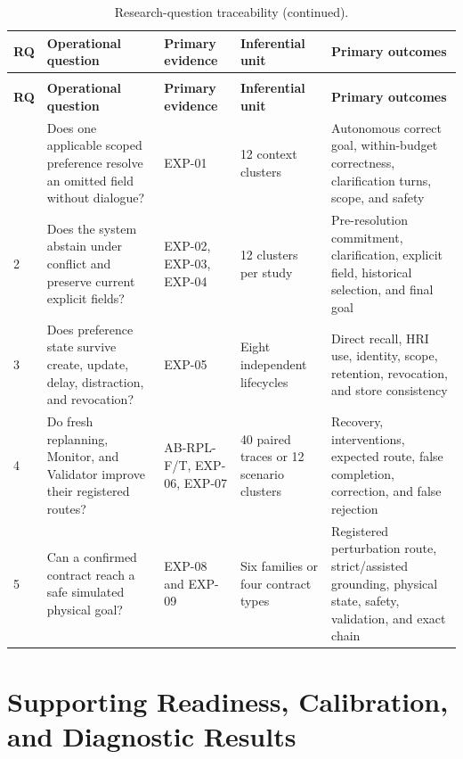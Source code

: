 \documentclass{article}
\begin{document}
{\small
\renewcommand{\arraystretch}{1.12}
\begin{longtable}{@{}P{0.75cm}P{3.80cm}P{3.00cm}P{2.30cm}P{4.30cm}@{}}
    \caption{Research questions, primary evidence, and outcomes.}
    \label{tab:app-rq-traceability} \\
    \toprule
    \textbf{RQ} & \textbf{Operational question} & \textbf{Primary evidence} &
    \textbf{Inferential unit} & \textbf{Primary outcomes} \\
    \midrule
    \endfirsthead
    \caption[]{Research-question traceability (continued).} \\
    \toprule
    \textbf{RQ} & \textbf{Operational question} & \textbf{Primary evidence} &
    \textbf{Inferential unit} & \textbf{Primary outcomes} \\
    \midrule
    \endhead
    \bottomrule
     & Does one applicable scoped preference resolve an omitted field without
    dialogue? & EXP-01 & 12 context clusters & Autonomous correct goal,
    within-budget correctness, clarification turns, scope, and safety \\
    2 & Does the system abstain under conflict and preserve current explicit
    fields? & EXP-02, EXP-03, EXP-04 & 12 clusters per study & Pre-resolution
    commitment, clarification, explicit field, historical selection, and
    final goal \\
    3 & Does preference state survive create, update, delay, distraction, and
    revocation? & EXP-05 & Eight independent lifecycles & Direct recall, HRI
    use, identity, scope, retention, revocation, and store consistency \\
    4 & Do fresh replanning, Monitor, and Validator improve their registered
    routes? & AB-RPL-F/T, EXP-06, EXP-07 & 40 paired traces or 12 scenario
    clusters & Recovery, interventions, expected route, false completion,
    correction, and false rejection \\
    5 & Can a confirmed contract reach a safe simulated physical goal? & EXP-08
    and EXP-09 & Six families or four contract types & Registered perturbation
    route, strict/assisted grounding, physical state, safety, validation, and
    exact chain \\
\end{longtable}
}


\clearpage
\section{Supporting Readiness, Calibration, and Diagnostic Results}
\label{app:supporting-results}
\end{document}
